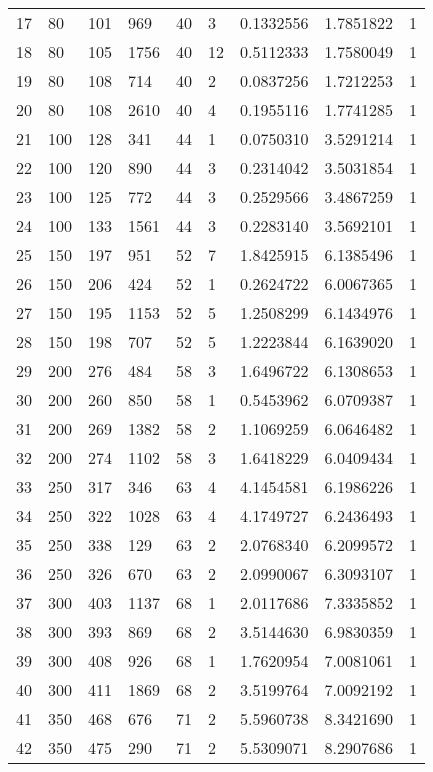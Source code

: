 \begin{longtable}{lllllllll}
  17 & 80 & 101 & 969 & 40 & 3 & 0.1332556 & 1.7851822 & 1 \\
  18 & 80 & 105 & 1756 & 40 & 12 & 0.5112333 & 1.7580049 & 1 \\
  19 & 80 & 108 & 714 & 40 & 2 & 0.0837256 & 1.7212253 & 1 \\
  20 & 80 & 108 & 2610 & 40 & 4 & 0.1955116 & 1.7741285 & 1 \\
  21 & 100 & 128 & 341 & 44 & 1 & 0.0750310 & 3.5291214 & 1 \\
  22 & 100 & 120 & 890 & 44 & 3 & 0.2314042 & 3.5031854 & 1 \\
  23 & 100 & 125 & 772 & 44 & 3 & 0.2529566 & 3.4867259 & 1 \\
  24 & 100 & 133 & 1561 & 44 & 3 & 0.2283140 & 3.5692101 & 1 \\
  25 & 150 & 197 & 951 & 52 & 7 & 1.8425915 & 6.1385496 & 1 \\
  26 & 150 & 206 & 424 & 52 & 1 & 0.2624722 & 6.0067365 & 1 \\
  27 & 150 & 195 & 1153 & 52 & 5 & 1.2508299 & 6.1434976 & 1 \\
  28 & 150 & 198 & 707 & 52 & 5 & 1.2223844 & 6.1639020 & 1 \\
  29 & 200 & 276 & 484 & 58 & 3 & 1.6496722 & 6.1308653 & 1 \\
  30 & 200 & 260 & 850 & 58 & 1 & 0.5453962 & 6.0709387 & 1 \\
  31 & 200 & 269 & 1382 & 58 & 2 & 1.1069259 & 6.0646482 & 1 \\
  32 & 200 & 274 & 1102 & 58 & 3 & 1.6418229 & 6.0409434 & 1 \\
  33 & 250 & 317 & 346 & 63 & 4 & 4.1454581 & 6.1986226 & 1 \\
  34 & 250 & 322 & 1028 & 63 & 4 & 4.1749727 & 6.2436493 & 1 \\
  35 & 250 & 338 & 129 & 63 & 2 & 2.0768340 & 6.2099572 & 1 \\
  36 & 250 & 326 & 670 & 63 & 2 & 2.0990067 & 6.3093107 & 1 \\
  37 & 300 & 403 & 1137 & 68 & 1 & 2.0117686 & 7.3335852 & 1 \\
  38 & 300 & 393 & 869 & 68 & 2 & 3.5144630 & 6.9830359 & 1 \\
  39 & 300 & 408 & 926 & 68 & 1 & 1.7620954 & 7.0081061 & 1 \\
  40 & 300 & 411 & 1869 & 68 & 2 & 3.5199764 & 7.0092192 & 1 \\
  41 & 350 & 468 & 676 & 71 & 2 & 5.5960738 & 8.3421690 & 1 \\
  42 & 350 & 475 & 290 & 71 & 2 & 5.5309071 & 8.2907686 & 1 \\

\end{longtable}

